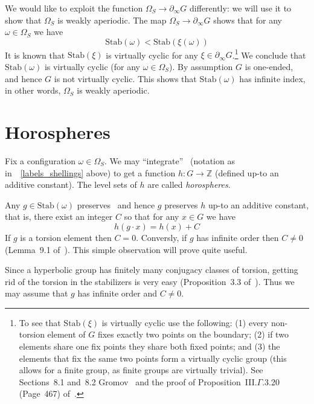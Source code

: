 \documentclass[12pt,reqno]{amsart}
\theoremstyle{plain}
\theoremstyle{definition}
\numberwithin{subcase}{case}
\theoremstyle{plain}
\theoremstyle{definition}
\def\stab[#1]{\mathrm{Stab}(#1)}
\begin{document}
We would like to exploit the function \(\Omega_{S} \to \partial_{\infty} G\) differently: we will use it to show that \(\Omega_{S}\) is weakly aperiodic. The map \(\Omega_{S} \to \partial_{\infty} G\) shows that for any \(\omega \in \Omega_{S}\) we have
\[
\stab[\omega] < \stab[\xi(\omega)]
\]
It is known that \(\stab[\xi]\) is virtually cyclic for any \(\xi \in \partial_{\infty} G\).\footnote{To see that \(\stab[\xi]\) is virtually cyclic use the following: (1) every non-torsion element of \(G\) fixes exactly two points on the boundary; (2) if two  elements share one fix points they share both fixed points; and (3) the elements that fix the same two points form a virtually cyclic group (this allows for a finite group, as finite groups are virtually trivial). See Sections~8.1 and~8.2 Gromov~\cite{gromov} and the proof of Proposition~III.\(\Gamma\).3.20 (Page~467) of~\cite{BridsonHaefliger}.}
We conclude that \(\stab[\omega]\) is virtually cyclic (for any \(\omega \in \Omega_{S}\)). By assumption \(G\) is one-ended, and hence \(G\) is not virtually cyclic. This shows that \(\stab[\omega]\) has infinite index, in other words, \(\Omega_{S}\) is weakly aperiodic.

\section{Horospheres}
\label{section:horospheres}

Fix a configuration \(\omega \in \Omega_{S}\).  We may ``integrate'' \dh\ (notation as in~~\eqref{labels_shellings} above) to get a function \(h:G \to \mathbb{Z}\) (defined up-to an additive constant).  The level sets of \(h\) are called {\it horospheres}. 

Any \(g \in \stab[\omega]\) preserves \dh\ and hence \(g\) preserves \(h\) up-to an additive constant, that is, there exist an integer \(C\) so that for any \(x \in G\) we have
\begin{equation}
h(g \cdot x) = h(x) + C
\end{equation}
If \(g\) is a torsion element then \(C=0\). Conversly, if \(g\) has infinite order then \(C \neq 0\) (Lemma~9.1  of~\cite{cohen_goodman-strauss_rieck_2021}). This simple observation will prove quite useful.


Since a hyperbolic group has finitely many conjugacy classes of torsion, getting rid of the torsion in the stabilizers is very easy (Proposition~3.3 of~\cite{cohen_goodman-strauss_rieck_2021}). Thus we may assume that \(g\) has infinite order and \(C \neq 0\).
\end{document}
